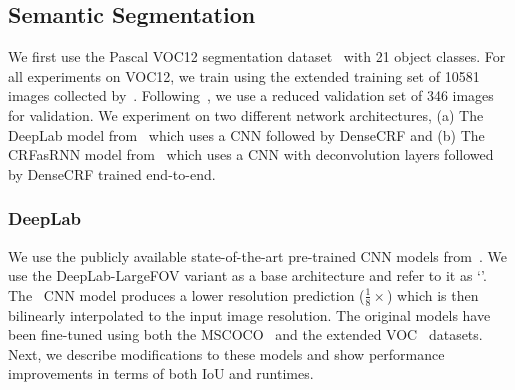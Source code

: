 \subsection{Semantic Segmentation}

We first use the Pascal VOC12 segmentation dataset~\cite{voc2012segmentation}
with 21 object classes.
For all experiments on VOC12, we train using the extended training set of
10581 images collected by~\cite{hariharan2011moredata}. Following~\cite{zheng2015conditional},
we use a reduced validation set of 346 images for validation.
We experiment on two different network architectures, (a) The DeepLab model from~\cite{chen2014semantic}
which uses a CNN followed by DenseCRF and (b) The CRFasRNN model from~\cite{zheng2015conditional} which uses a
CNN with deconvolution layers followed by DenseCRF trained end-to-end.

\subsubsection{DeepLab}\label{sec:deeplabmodel}
We use the publicly available state-of-the-art pre-trained CNN models from~\cite{chen2014semantic}.
We use the DeepLab-LargeFOV variant as a base architecture and refer to it as `\deeplab'.
The \deeplab~CNN model produces a lower resolution prediction ($\frac{1}{8}\times$)
which is then bilinearly interpolated to the input image resolution.
The original models have been fine-tuned using both the MSCOCO~\cite{lin2014microsoft} and the extended VOC~\cite{hariharan2011moredata} datasets.
Next, we describe modifications to these models and show performance improvements in terms of both IoU and runtimes.

